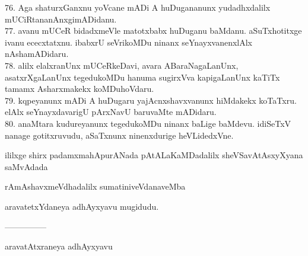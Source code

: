 \documentclass{article}
\begin{document}
76. Aga shaturxGanxnu yoVcane mADi A huDugananunx yudadhxdalilx mUCiRtananAnxgimADidanu.\\
77. avanu mUCeR bidadxmeVle matotxbabx huDuganu baMdanu. aSuTxhotitxge ivanu ececxtatxnu. ibabxrU seVrikoMDu ninanx seYnayxvanenxlAlx nAshamADidaru.\\
78. alilx elalxranUnx mUCeRkeDavi, avara ABaraNagaLanUnx, asatxrXgaLanUnx tegedukoMDu hanuma sugirxVva kapigaLanUnx kaTiTx tamamx Asharxmakekx koMDuhoVdaru.\\
79. kqpeyanunx mADi A huDugaru yajAcnxshavxvanunx hiMdakekx koTaTxru. elAlx seYnayxdavarigU pArxNavU baruvaMte mADidaru.\\
80. anaMtara kudureyanunx tegedukoMDu ninanx baLige baMdevu. idiSeTxV nanage gotitxruvudu, aSaTxnunx ninenxdurige heVLidedxVne.\\

\begin{center}
ililxge shirx padamxmahApurANada pAtALaKaMDadalilx sheVSavAtAsxyXyana saMvAdada
\end{center}

\begin{center}
rAmAshavxmeVdhadalilx sumatiniveVdanaveMba
\end{center}

\begin{center}
aravatetxYdaneya adhAyxyavu mugidudu.
\end{center}

\begin{center}
---------------
\end{center}

\begin{center}
aravatAtxraneya adhAyxyavu
\end{center}
\end{document}
